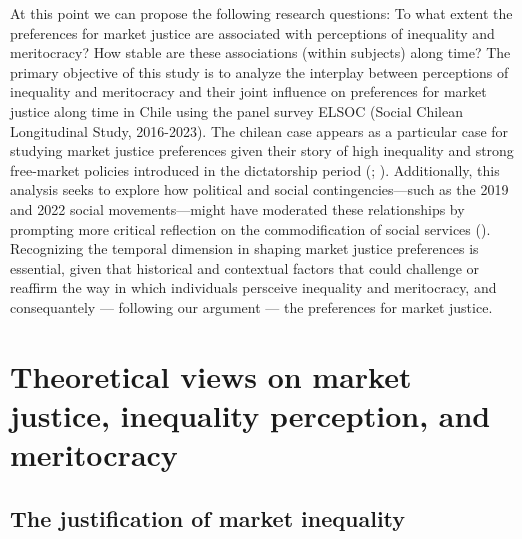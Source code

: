 \documentclass[
  12pt,
]{article}
\begin{document}
At this point we can propose the following research questions: To what
extent the preferences for market justice are associated with
perceptions of inequality and meritocracy? How stable are these
associations (within subjects) along time? The primary objective of this
study is to analyze the interplay between perceptions of inequality and
meritocracy and their joint influence on preferences for market justice
along time in Chile using the panel survey ELSOC (Social Chilean
Longitudinal Study, 2016-2023). The chilean case appears as a particular
case for studying market justice preferences given their story of high
inequality and strong free-market policies introduced in the
dictatorship period (; ).
Additionally, this analysis seeks to explore how political and social
contingencies---such as the 2019 and 2022 social movements---might have
moderated these relationships by prompting more critical reflection on
the commodification of social services
(). Recognizing the
temporal dimension in shaping market justice preferences is essential,
given that historical and contextual factors that could challenge or
reaffirm the way in which individuals persceive inequality and
meritocracy, and consequantely --- following our argument --- the
preferences for market justice.

\section{Theoretical views on market justice, inequality perception, and
meritocracy}\label{theoretical-views-on-market-justice-inequality-perception-and-meritocracy}

\subsection{The justification of market
inequality}\label{the-justification-of-market-inequality}
\end{document}
